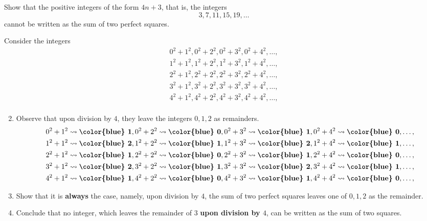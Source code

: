 \documentclass[paper=6.125in:9.25in,twoside,openright,pagesize=pdftex,10pt]{scrbook}
\newcommand{\alertb}[1]{\textbf{\color{blue} #1}}
\begin{document}
\begin{problem}
Show that the positive integers of the form $4n+3$, that is, the integers
\[
3, 7, 11, 15, 19, \dots
\]
cannot be written as the sum of two perfect squares. 
\end{problem}


\begin{walk}
	\ii Consider the integers
	\begin{align*}
	0^2 + 1^2, 0^2 + 2^2, 0^2 + 3^2, 0^2 + 4^2, \dots, \\
	1^2 + 1^2, 1^2 + 2^2, 1^2 + 3^2, 1^2 + 4^2, \dots, \\
	2^2 + 1^2, 2^2 + 2^2, 2^2 + 3^2, 2^2 + 4^2, \dots, \\
	3^2 + 1^2, 3^2 + 2^2, 3^2 + 3^2, 3^2 + 4^2, \dots, \\
	4^2 + 1^2, 4^2 + 2^2, 4^2 + 3^2, 4^2 + 4^2, \dots, \\
	\end{align*}

	
\end{walk}

\begin{enumerate}[\bfseries (a)]
  \setcounter{enumi}{1}
\item 
Observe that upon division by $4$, they leave the integers $0, 1, 2$ as remainders. 
	\begin{align*}
	0^2 + 1^2 \rightsquigarrow \alertb{1}, 0^2 + 2^2 \rightsquigarrow \alertb{0}, 0^2 + 3^2 \rightsquigarrow \alertb{1}, 0^2 + 4^2 \rightsquigarrow \alertb{0}, \dots, \\
	1^2 + 1^2 \rightsquigarrow \alertb{2}, 1^2 + 2^2 \rightsquigarrow \alertb{1}, 1^2 + 3^2 \rightsquigarrow \alertb{2}, 1^2 + 4^2 \rightsquigarrow \alertb{1}, \dots, \\
	2^2 + 1^2 \rightsquigarrow \alertb{1}, 2^2 + 2^2 \rightsquigarrow \alertb{0}, 2^2 + 3^2 \rightsquigarrow \alertb{1}, 2^2 + 4^2 \rightsquigarrow \alertb{0}, \dots, \\
	3^2 + 1^2 \rightsquigarrow \alertb{2}, 3^2 + 2^2 \rightsquigarrow \alertb{1}, 3^2 + 3^2 \rightsquigarrow \alertb{2}, 3^2 + 4^2 \rightsquigarrow \alertb{1}, \dots, \\
	4^2 + 1^2 \rightsquigarrow \alertb{1}, 4^2 + 2^2 \rightsquigarrow \alertb{0}, 4^2 + 3^2 \rightsquigarrow \alertb{1}, 4^2 + 4^2 \rightsquigarrow \alertb{0}, \dots, \\
	\end{align*}

\item Show that it is \alertb{always} the case, namely, upon division by $4$,  the sum of two perfect squares leaves one of $0, 1, 2$ as the remainder. 
\item 
Conclude that no integer, which leaves the remainder of $3$ \textbf{\color{magenta}upon division by $4$}, 
can be written as the sum of two squares.

\end{enumerate}
\end{document}
